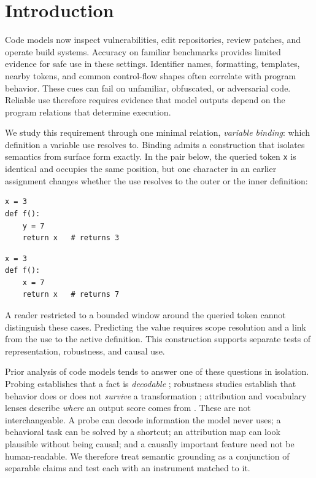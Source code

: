 \documentclass[10pt]{article}
\newcommand{\code}[1]{\texttt{#1}}
\begin{document}
\section{Introduction}
Code models now inspect vulnerabilities, edit repositories, review patches, and
operate build systems. Accuracy on familiar benchmarks provides limited evidence
for safe use in these settings. Identifier names, formatting, templates, nearby
tokens, and common control-flow shapes often correlate with program behavior.
These cues can fail on unfamiliar, obfuscated, or adversarial code. Reliable use
therefore requires evidence that model outputs depend on the program relations
that determine execution.

We study this requirement through one minimal relation, \emph{variable binding}:
which definition a variable use resolves to. Binding admits a construction that
isolates semantics from surface form exactly. In the pair below, the queried
token \code{x} is identical and occupies the same position, but one character in
an earlier assignment changes whether the use resolves to the outer or the inner
definition:
\begin{center}
\begin{minipage}{0.44\linewidth}
\begin{lstlisting}
x = 3
def f():
    y = 7
    return x   # returns 3
\end{lstlisting}
\end{minipage}\hfill
\begin{minipage}{0.44\linewidth}
\begin{lstlisting}
x = 3
def f():
    x = 7
    return x   # returns 7
\end{lstlisting}
\end{minipage}
\end{center}
A reader restricted to a bounded window around the queried token cannot
distinguish these cases. Predicting the value requires scope resolution and a
link from the use to the active definition. This construction supports separate
tests of representation, robustness, and causal use.

Prior analysis of code models tends to answer one of these questions in
isolation. Probing establishes that a fact is \emph{decodable}
\citep{karmakar2021whatdo,wan2022theyknow,troshin2022probing}; robustness studies
establish that behavior does or does not \emph{survive} a transformation
\citep{yefet2020adversarial,henkel2022semantic,rabin2021generalizability};
attribution and vocabulary lenses describe \emph{where} an output score comes from
\citep{bach2015lrp,nostalgebraist2020logitlens}. These are not
interchangeable. A probe can decode information the model never uses; a
behavioral task can be solved by a shortcut; an attribution map can look
plausible without being causal; and a causally important feature need not be
human-readable. We therefore treat semantic grounding as a conjunction of
separable claims and test each with an instrument matched to it.
\end{document}
